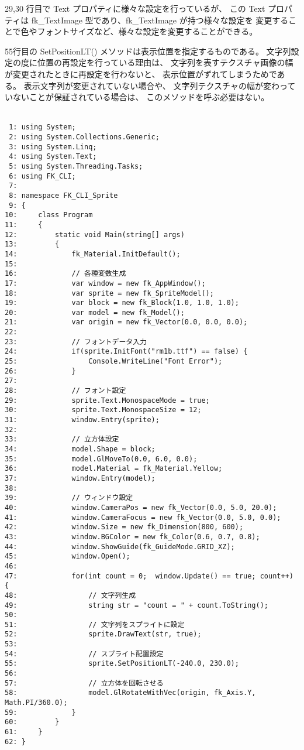29,30 行目で Text プロパティに様々な設定を行っているが、
この Text プロパティは fk\_TextImage 型であり、fk\_TextImage が持つ様々な設定を
変更することで色やフォントサイズなど、様々な設定を変更することができる。

55行目の SetPositionLT() メソッドは表示位置を指定するものである。
文字列設定の度に位置の再設定を行っている理由は、
文字列を表すテクスチャ画像の幅が変更されたときに再設定を行わないと、
表示位置がずれてしまうためである。
表示文字列が変更されていない場合や、
文字列テクスチャの幅が変わっていないことが保証されている場合は、
このメソッドを呼ぶ必要はない。\\ ~

\begin{breakbox}
\begin{small}
\begin{verbatim}
 1: using System;
 2: using System.Collections.Generic;
 3: using System.Linq;
 4: using System.Text;
 5: using System.Threading.Tasks;
 6: using FK_CLI;
 7: 
 8: namespace FK_CLI_Sprite
 9: {
10:     class Program
11:     {
12:         static void Main(string[] args)
13:         {
14:             fk_Material.InitDefault();
15: 
16:             // 各種変数生成
17:             var window = new fk_AppWindow();
18:             var sprite = new fk_SpriteModel();
19:             var block = new fk_Block(1.0, 1.0, 1.0);
20:             var model = new fk_Model();
21:             var origin = new fk_Vector(0.0, 0.0, 0.0);
22: 
23:             // フォントデータ入力
24:             if(sprite.InitFont("rm1b.ttf") == false) {
25:                 Console.WriteLine("Font Error");
26:             }
27: 
28:             // フォント設定
29:             sprite.Text.MonospaceMode = true;
30:             sprite.Text.MonospaceSize = 12;
31:             window.Entry(sprite);
32: 
33:             // 立方体設定
34:             model.Shape = block;
35:             model.GlMoveTo(0.0, 6.0, 0.0);
36:             model.Material = fk_Material.Yellow;
37:             window.Entry(model);
38: 
39:             // ウィンドウ設定
40:             window.CameraPos = new fk_Vector(0.0, 5.0, 20.0);
41:             window.CameraFocus = new fk_Vector(0.0, 5.0, 0.0);
42:             window.Size = new fk_Dimension(800, 600);
43:             window.BGColor = new fk_Color(0.6, 0.7, 0.8);
44:             window.ShowGuide(fk_GuideMode.GRID_XZ);
45:             window.Open();
46:  
47:             for(int count = 0;  window.Update() == true; count++) {
48:                 // 文字列生成
49:                 string str = "count = " + count.ToString();
50: 
51:                 // 文字列をスプライトに設定
52:                 sprite.DrawText(str, true);
53: 
54:                 // スプライト配置設定
55:                 sprite.SetPositionLT(-240.0, 230.0);
56: 
57:                 // 立方体を回転させる
58:                 model.GlRotateWithVec(origin, fk_Axis.Y, Math.PI/360.0);
59:             }
60:         }
61:     }
62: }
\end{verbatim}
\end{small}
\end{breakbox}

